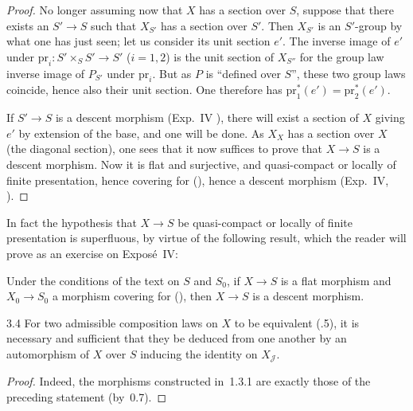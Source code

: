 \begin{proof}
No longer assuming now that \(X\) has a section over \(S\), suppose that there
exists an \(S'\to S\) such that \(X_{S'}\) has a section over \(S'\). Then
\(X_{S'}\) is an \(S'\)-group by what one has just seen; let us consider its
unit section \(e'\). The inverse image of \(e'\) under
\(\mathrm{pr}_{i}\colon S'\times_{S}S'\to S'\) (\(i=1,2\)) is the unit section
of \(X_{S''}\) for the group law inverse image of \(P_{S'}\) under
\(\mathrm{pr}_{i}\). But as \(P\) is ``defined over \(S\)'', these two group
laws coincide, hence also their unit section. One therefore has
\(\mathrm{pr}_{1}^{*}(e')=\mathrm{pr}_{2}^{*}(e')\).

If \(S'\to S\) is a descent morphism (\cf Exp.~IV ), there will exist a
section of \(X\) giving \(e'\) by extension of the base, and one will be done.
As \(X_{X}\) has a section over \(X\) (the diagonal section), one sees that it
now suffices to prove that \(X\to S\) is a descent morphism. Now it is flat and
surjective, and quasi-compact or locally of finite presentation, hence covering
for (\fpqc), hence a descent morphism (Exp.~IV, ).
\end{proof}

\begin{remark*}
In fact the hypothesis that \(X\to S\) be quasi-compact or locally of finite
presentation is superfluous, by virtue of the following result, which the
reader will prove as an exercise on Exposé~IV:

Under the conditions of the text on \(S\) and \(S_{0}\), if \(X\to S\) is a
flat morphism and \(X_{0}\to S_{0}\) a morphism covering for (\fpqc), then
\(X\to S\) is a descent morphism.
\end{remark*}

\begin{lemma}{3.4}\label{III.3.4}
For two admissible composition laws on \(X\) to be equivalent (.5), it
is necessary and sufficient that they be deduced from one another by an
automorphism of \(X\) over \(S\) inducing the identity on \(X_{\mathcal{J}}\).
\end{lemma}

\begin{proof}
\renewcommand{\qedsymbol}{}
Indeed, the morphisms constructed in~1.3.1 are exactly those of the preceding
statement (by~0.7).%
{\renewcommand{\thefootnote}{(68)}}
\end{proof}

